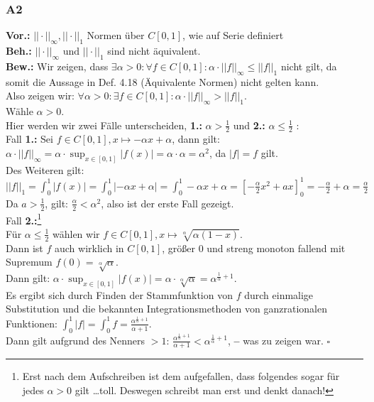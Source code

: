 \documentclass[12pt, a4paper]{article}
\newcommand*{\qed}{\null\nobreak\hfill\ensuremath{\square}}
\newcommand*{\gedanke}{\textbf{-- }}
\newcommand*{\gap}{\text{ }}
\newcommand*{\vor}{\textbf{Vor.:} \gap}
\newcommand*{\beh}{\textbf{Beh.:} \gap}
\newcommand*{\bew}{\textbf{Bew.:} \gap}
\begin{document}
\subsubsection*{A2}
\vor \(||\cdot||_\infty, ||\cdot||_1\) Normen über \(C[0,1]\), wie auf Serie definiert\\
\beh \(||\cdot||_\infty \text{ und } ||\cdot||_1\) sind nicht äquivalent. \\
\bew Wir zeigen, dass \(\exists \alpha > 0: \forall f \in C[0,1]: \alpha \cdot ||f||_\infty \le ||f||_1\) nicht gilt, da somit die Aussage in Def. 4.18 (Äquivalente Normen) nicht gelten kann. \\
Also zeigen wir: \(\forall \alpha > 0: \exists f \in C[0,1]: \alpha \cdot ||f||_\infty > ||f||_1\). \\
Wähle \(\alpha > 0\).\\
Hier werden wir zwei Fälle unterscheiden, \textbf{1.:} \(\alpha > \frac{1}{2}\) und \textbf{2.:} \(\alpha \le \frac{1}{2}\) : \\
Fall \textbf{1.:} Sei \(f \in C[0,1], x \mapsto -\alpha x + \alpha\), dann gilt: \\
\(\alpha \cdot ||f||_\infty = \alpha \cdot \sup_{x\in [0,1]}|f(x)| = \alpha \cdot \alpha = \alpha^2\),  da \(|f| = f\) gilt. \\
Des Weiteren gilt: \(||f||_1 = \int_{0}^{1}|f(x)| = \int_{0}^{1}|-\alpha x + \alpha| = \int_{0}^{1}-\alpha x + \alpha = \left[-\frac{\alpha}{2}x^2+ ax\right]_0^1 = -\frac{\alpha}{2} + \alpha = \frac{\alpha}{2}\) \\
Da \(a > \frac{1}{2}\), gilt: \(\frac{\alpha}{2} < \alpha^2\), also ist der erste Fall gezeigt. \\
Fall \textbf{2.:}\footnote[1]{Erst nach dem Aufschreiben ist dem  aufgefallen, dass folgendes sogar für jedes \(\alpha > 0\) gilt \dots toll. Deswegen schreibt man erst und denkt danach!} \\
Für \(\alpha \le \frac{1}{2}\) wählen wir \(f \in C[0,1], x \mapsto \sqrt[\alpha]{\alpha(1-x)}\). \\
Dann ist \(f\) auch wirklich in \(C[0,1]\), größer 0 und streng monoton fallend mit Supremum \(f(0) = \sqrt[\alpha]{\alpha}\). \\
Dann gilt: \(\alpha \cdot \sup_{x \in [0,1]}|f(x)| = \alpha \cdot \sqrt[\alpha]{\alpha} = \alpha^{\frac{1}{\alpha} + 1}\). \\
Es ergibt sich durch Finden der Stammfunktion von \(f\) durch einmalige Substitution und die bekannten Integrationsmethoden von ganzrationalen Funktionen: \(\int_{0}^{1}|f| = \int_{0}^{1}f = \frac{\alpha^{\frac{1}{\alpha} + 1}}{\alpha + 1}\).\\
Dann gilt aufgrund des Nenners \(> 1\): \(\frac{\alpha^{\frac{1}{\alpha} + 1}}{\alpha + 1} < \alpha^ {\frac{1}{\alpha} + 1}\), \gedanke was zu zeigen war. \qed \pagebreak 
\end{document}
